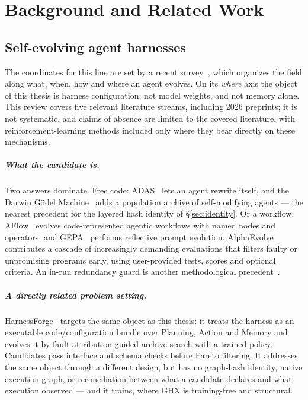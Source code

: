 \chapter{Background and Related Work}
\label{ch:related}



\section{Self-evolving agent harnesses}
\label{sec:self-evolving}

The coordinates for this line are set by a recent survey~\cite{survey-selfevolve},
which organizes the field along what, when, how and where an agent evolves.
On its \emph{where} axis the object of this thesis is harness
configuration: not model weights, and not memory alone. This review covers
five relevant literature streams, including 2026 preprints; it is not
systematic, and claims of absence are limited to the covered literature,
with reinforcement-learning methods included only where they bear directly
on these mechanisms.

\paragraph{What the candidate is.} Two answers dominate. Free code:
ADAS~\cite{adas} lets an agent rewrite itself, and the Darwin G\"odel
Machine~\cite{dgm} adds a population archive of self-modifying agents ---
the nearest precedent for the layered hash identity of
\S\ref{sec:identity}. Or a workflow: AFlow~\cite{aflow} evolves code-represented agentic workflows with named nodes and operators, and GEPA~\cite{gepa} performs reflective prompt evolution.
AlphaEvolve~\cite{alphaevolve} contributes a cascade of increasingly demanding evaluations that filters faulty or unpromising programs early, using user-provided tests, scores and optional criteria. An in-run redundancy guard is another methodological
precedent~\cite{ledger-t17}.

\paragraph{A directly related problem setting.} HarnessForge~\cite{harnessforge}
targets the same object as this thesis: it treats the harness as an executable code/configuration bundle over
Planning, Action and Memory and evolves it by fault-attribution-guided archive
search with a trained policy. Candidates pass interface and schema checks
before Pareto filtering. It addresses the same object through a different
design, but has no graph-hash identity, native execution graph, or
reconciliation between what a candidate declares and what execution observed --- and it trains, where GHX is
training-free and structural.

